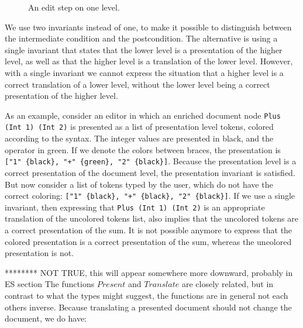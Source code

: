 \begin{figure}
\begin{small}
\begin{center}
\begin{center}
\end{center}\caption{An edit step on one level.}\label{layerEditProcess} 
\end{center}
\end{small}
\end{figure}

We use two invariants instead of one, to make it possible to distinguish between the intermediate condition and the postcondition. The alternative is using a single invariant that states that the lower level is a presentation of the higher level, as well as that the higher level is a translation of the lower level. However, with a single invariant we cannot express the situation that a higher level is a correct translation of a lower level, without the lower level being a correct presentation of the higher level.

As an example, consider an editor in which an enriched document node \verb|Plus (Int 1) (Int 2)| is presented as a list of presentation level tokens, colored according to the syntax. The integer values are presented in black, and the operator in green. If we denote the colors between braces, the presentation is \verb|["1" {black}, "+" {green}, "2" {black}]|. Because the presentation level is a correct presentation of the document level, the presentation invariant is satisfied. But now consider a list of tokens typed by the user, which do not have the correct coloring: \verb|["1" {black}, "+" {black}, "2" {black}]|. If we use a single invariant, then expressing that \verb|Plus (Int 1) (Int 2)| is an appropriate translation of the uncolored tokens list, also implies that the uncolored tokens are a correct presentation of the sum. It is not possible anymore to express that the colored presentation is a correct presentation of the sum, whereas the uncolored presentation is not. 

\bc
{}
******** NOT TRUE, this will appear somewhere more downward, probably in ES section
The functions $Present$ and $Translate$ are closely related, but in contrast to what the types might suggest, the functions are in general not each others inverse. Because translating a presented document should not change the document, we do have: 

